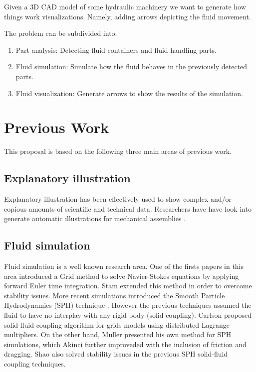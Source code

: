 \documentclass[11pt]{report}
\begin{document}
Given a 3D CAD model of some hydraulic machinery we want to generate how things work visualizations.
Namely, adding arrows depicting the fluid movement.

The problem can be subdivided into:
\begin{enumerate}
\item Part analysis: Detecting fluid containers and fluid handling parts.
\item Fluid simulation: Simulate how the fluid behaves in the previously detected parts.
\item Fluid visualization: Generate arrows to show the results of the simulation. 
\end{enumerate}

\section{Previous Work}

This proposal is based on the following three main areas of previous work.

\subsection{Explanatory illustration}

Explanatory illustration has been effectively used to show complex and/or copious amounts of  scientific and technical data.
Researchers have have look into generate automatic illustrations for mechanical assemblies \cite{Mitra2010}.


\subsection{Fluid simulation}

Fluid simulation is a well known research area. 
One of the firsts papers in this area introduced a Grid method \cite{Foster1996} to solve Navier-Stokes equations by applying forward Euler time integration. 
Stam \cite{Stam1999} extended this method in order to overcome stability issues.
More recent simulations introduced the Smooth Particle Hydrodynamics (SPH) technique \cite{DesbrunMathieuandGascuel1996}.
However the previous techniques assumed the fluid to have no interplay with any rigid body (solid-coupling).
Carlson \cite{Carlson2004} proposed solid-fluid coupling algorithm for grids models using distributed Lagrange multipliers.
On the other hand, Muller \cite{Muller2004} presented his own method for SPH simulations, which Akinci \cite{Akinci2012} further improveded with the inclusion of friction and dragging. 
Shao \cite{Shao2014} also solved stability issues in the previous SPH solid-fluid coupling techniques.
\end{document}

